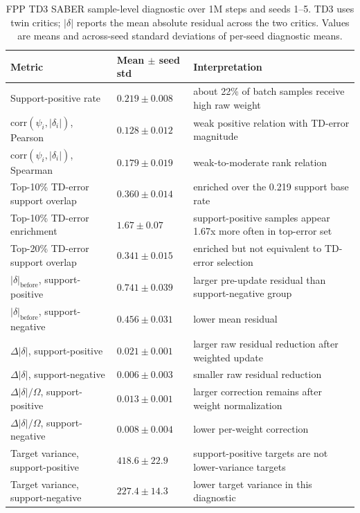 \documentclass[letterpaper]{article}
\begin{document}
\begin{table}[t]
\centering
\small
\caption{FPP TD3 SABER sample-level diagnostic over 1M steps and seeds 1--5. TD3 uses twin critics; \(|\delta|\) reports the mean absolute residual across the two critics. Values are means and across-seed standard deviations of per-seed diagnostic means.}
\label{tab:fpp-td3-diagnostic}
\begin{tabular}{p{}p{}p{}}
\toprule
Metric & Mean \(\pm\) seed std & Interpretation \\
\midrule
Support-positive rate & \(0.219 \pm 0.008\) & about 22\% of batch samples receive high raw weight \\
\(\mathrm{corr}(\psi_i,|\delta_i|)\), Pearson & \(0.128 \pm 0.012\) & weak positive relation with TD-error magnitude \\
\(\mathrm{corr}(\psi_i,|\delta_i|)\), Spearman & \(0.179 \pm 0.019\) & weak-to-moderate rank relation \\
Top-10\% TD-error support overlap & \(0.360 \pm 0.014\) & enriched over the 0.219 support base rate \\
Top-10\% TD-error enrichment & \(1.67 \pm 0.07\) & support-positive samples appear 1.67x more often in top-error set \\
Top-20\% TD-error support overlap & \(0.341 \pm 0.015\) & enriched but not equivalent to TD-error selection \\
\(|\delta|_{\mathrm{before}}\), support-positive & \(0.741 \pm 0.039\) & larger pre-update residual than support-negative group \\
\(|\delta|_{\mathrm{before}}\), support-negative & \(0.456 \pm 0.031\) & lower mean residual \\
\(\Delta|\delta|\), support-positive & \(0.021 \pm 0.001\) & larger raw residual reduction after weighted update \\
\(\Delta|\delta|\), support-negative & \(0.006 \pm 0.003\) & smaller raw residual reduction \\
\(\Delta|\delta|/\Omega\), support-positive & \(0.013 \pm 0.001\) & larger correction remains after weight normalization \\
\(\Delta|\delta|/\Omega\), support-negative & \(0.008 \pm 0.004\) & lower per-weight correction \\
Target variance, support-positive & \(418.6 \pm 22.9\) & support-positive targets are not lower-variance targets \\
Target variance, support-negative & \(227.4 \pm 14.3\) & lower target variance in this diagnostic \\
\bottomrule
\end{tabular}
\end{table}
\end{document}
